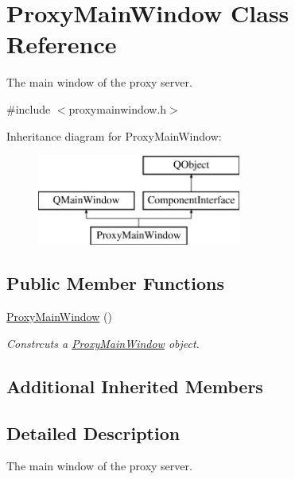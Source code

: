 \hypertarget{class_proxy_main_window}{\section{Proxy\-Main\-Window Class Reference}
\label{class_proxy_main_window}
}


The main window of the proxy server.  




{\ttfamily \#include $<$proxymainwindow.\-h$>$}

Inheritance diagram for Proxy\-Main\-Window\-:\begin{figure}[H]
\begin{center}
\leavevmode
\includegraphics[height=3.000000cm]{class_proxy_main_window}
\end{center}
\end{figure}
\subsection*{Public Member Functions}
\begin{DoxyCompactItemize}
\item 
\hyperlink{class_proxy_main_window_ac2c2ee77d7abef4c7405bc0c7080ef68}{Proxy\-Main\-Window} ()
\begin{DoxyCompactList}\small\item\em Constrcuts a \hyperlink{class_proxy_main_window}{Proxy\-Main\-Window} object. \end{DoxyCompactList}\end{DoxyCompactItemize}
\subsection*{Additional Inherited Members}


\subsection{Detailed Description}
The main window of the proxy server. 

